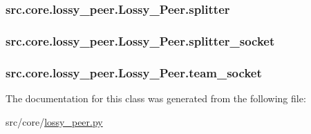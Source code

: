 \subsubsection[{splitter}]{\setlength{\rightskip}{0pt plus 5cm}src.\+core.\+lossy\+\_\+peer.\+Lossy\+\_\+\+Peer.\+splitter}\label{classsrc_1_1core_1_1lossy__peer_1_1Lossy__Peer_a850ba6d9b1c9b3530f319a2ad70fe9f8}
\hypertarget{classsrc_1_1core_1_1lossy__peer_1_1Lossy__Peer_a087e9cd5f4cff34cf27e0ba681f07594}{}
\subsubsection[{splitter\+\_\+socket}]{\setlength{\rightskip}{0pt plus 5cm}src.\+core.\+lossy\+\_\+peer.\+Lossy\+\_\+\+Peer.\+splitter\+\_\+socket}\label{classsrc_1_1core_1_1lossy__peer_1_1Lossy__Peer_a087e9cd5f4cff34cf27e0ba681f07594}
\hypertarget{classsrc_1_1core_1_1lossy__peer_1_1Lossy__Peer_a3f17b1d5038ff538511b5197d6c8a22e}{}
\subsubsection[{team\+\_\+socket}]{\setlength{\rightskip}{0pt plus 5cm}src.\+core.\+lossy\+\_\+peer.\+Lossy\+\_\+\+Peer.\+team\+\_\+socket}\label{classsrc_1_1core_1_1lossy__peer_1_1Lossy__Peer_a3f17b1d5038ff538511b5197d6c8a22e}


The documentation for this class was generated from the following file\+:\begin{DoxyCompactItemize}
\item 
src/core/\hyperlink{lossy__peer_8py}{lossy\+\_\+peer.\+py}\end{DoxyCompactItemize}
